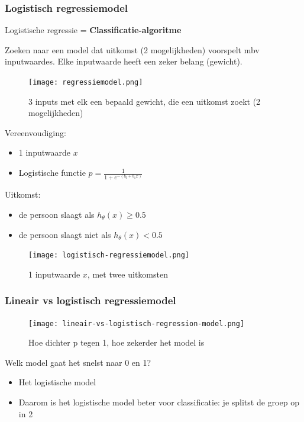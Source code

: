 \documentclass{article}
\begin{document}
\subsubsection{Logistisch regressiemodel}

Logistische regressie = \textbf{Classificatie-algoritme}

Zoeken naar een model dat uitkomst (2 mogelijkheden) voorspelt mbv inputwaardes.
Elke inputwaarde heeft een zeker belang (gewicht).

\begin{figure}[H]
    \centering
    \texttt{[image: regressiemodel.png]}
    \caption{3 inputs met elk een bepaald gewicht, die een uitkomst zoekt (2 mogelijkheden)}
\end{figure}

Vereenvoudiging:  

\begin{itemize}
    \item 1 inputwaarde $x$
    \item Logistische functie $p = \frac{1}{1 + e^{-(b_0+b_1x)}}$
\end{itemize}

Uitkomst:

\begin{itemize}
    \item de persoon slaagt als $h_{\theta}(x) \geq 0.5$
    \item de persoon slaagt niet als $h_{\theta}(x) < 0.5$
\end{itemize}

\begin{figure}[H]
    \centering
    \texttt{[image: logistisch-regressiemodel.png]}
    \caption{1 inputwaarde $x$, met twee  uitkomsten}
\end{figure}

\subsubsection{Lineair vs logistisch regressiemodel}

\begin{figure}[H]
    \centering
    \texttt{[image: lineair-vs-logistisch-regression-model.png]}
    \caption{Hoe dichter p tegen 1, hoe zekerder het model is}
\end{figure}

Welk model gaat het snelst naar 0 en 1? 

\begin{itemize}
    \item Het logistische model
    \item Daarom is het logistische model beter voor classificatie: je splitst de groep op in 2
\end{itemize}
\end{document}
